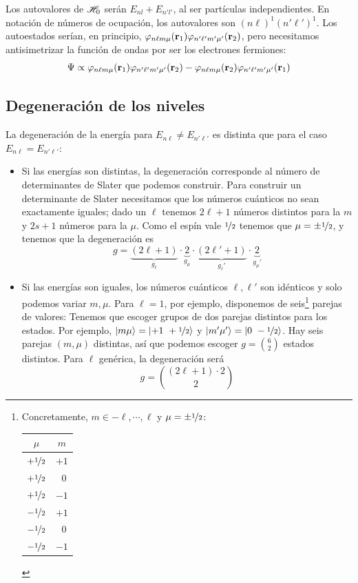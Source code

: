 Los autovalores de $ \mathscr{H} _0$ serán $E_{nl}+E_{n'l'}$, al ser
partículas independientes. En notación de números de ocupación, los
autovalores son $(n\ell)^1(n'\ell')^1$. Los autoestados serían, en
principio,
$\varphi_{n\ell m\mu}(\bm{\mathrm{r}}_1)\varphi_{n'\ell'm'\mu'}(\bm{\mathrm{r}}_2)$, pero
necesitamos antisimetrizar la función de ondas por ser los electrones
fermiones:
\begin{equation}
  \Psi \propto  
\varphi_{n\ell m\mu}(\bm{\mathrm{r}}_1)\varphi_{n'\ell'm'\mu'}(\bm{\mathrm{r}}_2) - \varphi_{n\ell m\mu}(\bm{\mathrm{r}}_2)\varphi_{n'\ell'm'\mu'}(\bm{\mathrm{r}}_1)
\end{equation}


\subsection{Degeneración de los niveles}
\label{subsection:deglevel}

La degeneración de la energía para $E_{n\ell}\neq E_{n'\ell'}$ es distinta
que para el caso $E_{n\ell} = E_{n'\ell'}$:
\begin{itemize}
\item Si las energías son distintas,
 la degeneración corresponde al
  número de determinantes de Slater que podemos construir. Para
  construir un determinante de Slater necesitamos que los números
  cuánticos no sean exactamente iguales; dado un $\ell$ tenemos $2\ell +1$
  números distintos para la $m$ y $2s+1$ números para la $\mu$.
  Como el espín vale ${\nicefrac{1}{2}}$ tenemos que $\mu = \pm {\nicefrac{1}{2}}$, y tenemos que
  la degeneración es
  \begin{equation}
    g = \underbrace{(2\ell +1)}_{g_\ell} \cdot \underbrace{2}_{g_\mu} \cdot
    \underbrace{(2\ell' +1)}_{g_\ell'} \cdot \underbrace{2}_{g_\mu'}
  \end{equation}
\item Si las energías son iguales, los números cuánticos $\ell,\ell'$
  son idénticos y solo podemos variar $m,\mu$. Para $\ell=1$, por
  ejemplo, disponemos de seis\footnote{Concretamente,
    $m\in -\ell,\cdots,\ell$ y $\mu = \pm {\nicefrac{1}{2}}$:
  \begin{center}
    \begin{tabular}{c|c}
     $\mu$ & $m$ \\ \hline
      $+{\nicefrac{1}{2}}$ & $+1$ \\ 
      $+{\nicefrac{1}{2}}$ & $\ \ 0$ \\ 
      $+{\nicefrac{1}{2}}$ & $-1$ \\ 
      $-{\nicefrac{1}{2}}$ & $+1$ \\ 
      $-{\nicefrac{1}{2}}$ & $\ \ 0$  \\ 
      $-{\nicefrac{1}{2}}$ & $-1$ \\ 
    \end{tabular}
  \end{center}
}
parejas de valores:
Tenemos que escoger grupos de dos parejas distintos para los estados.
Por ejemplo, $\ket{m\mu}=\ket{+1\ +\oh}$ y $\ket{m'\mu'}=\ket{0\ -\oh}$.
Hay seis parejas $(m,\mu)$ distintas, así que podemos escoger
$g=\binom{6}{2}$ estados distintos. Para $\ell$ genérica, la
degeneración será
\begin{equation}
  g = \binom{(2\ell + 1)\cdot 2}{2}
\end{equation}
\end{itemize}

